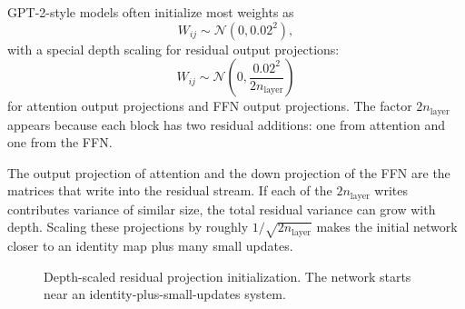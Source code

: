 \documentclass[11pt,a4paper]{article}
\theoremstyle{definition}
\theoremstyle{plain}
\newcommand{\vx}{\bm{x}}
\newcommand{\nlayer}{n_{\mathrm{layer}}}
\begin{document}
GPT-2-style models often initialize most weights as
\begin{equation}
    W_{ij}\sim\mathcal{N}(0,0.02^2),
\end{equation}
with a special depth scaling for residual output projections:
\begin{equation}\label{eq:gpt2_init}
    W_{ij}\sim\mathcal{N}\!\left(0,\frac{0.02^2}{2\nlayer}\right)
\end{equation}
for attention output projections and FFN output projections. The factor $2\nlayer$ appears because each block has two residual additions: one from attention and one from the FFN.

\begin{motivationbox}
The output projection of attention and the down projection of the FFN are the matrices that write into the residual stream. If each of the $2\nlayer$ writes contributes variance of similar size, the total residual variance can grow with depth. Scaling these projections by roughly $1/\sqrt{2\nlayer}$ makes the initial network closer to an identity map plus many small updates.
\end{motivationbox}

\begin{figure}[H]
\centering
{}
\caption{Depth-scaled residual projection initialization. The network starts near an identity-plus-small-updates system.}
\label{fig:init-scaling}
\end{figure}
\end{document}
